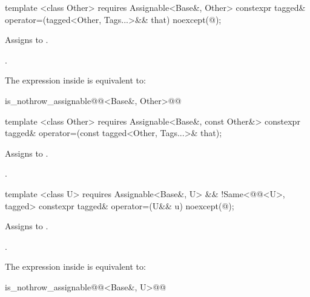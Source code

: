 {
\begin{itemdecl}
template <class Other>
  requires Assignable<Base&, Other>
constexpr tagged& operator=(tagged<Other, Tags...>&& that) noexcept(@\seebelow@);
\end{itemdecl}

\begin{itemdescr}
\pnum
\effects Assigns  to .

\pnum
\returns {}.

\pnum
\remarks The expression inside  is equivalent to:

\begin{codeblock}
is_nothrow_assignable@@<Base&, Other>@@
\end{codeblock}
\end{itemdescr}

\begin{itemdecl}
template <class Other>
  requires Assignable<Base&, const Other&>
constexpr tagged& operator=(const tagged<Other, Tags...>& that);
\end{itemdecl}

\begin{itemdescr}
\pnum
\effects Assigns  to .

\pnum
\returns {}.
\end{itemdescr}

\begin{itemdecl}
template <class U>
  requires Assignable<Base&, U> && !Same<@@<U>, tagged>
constexpr tagged& operator=(U&& u) noexcept(@\seebelow@);
\end{itemdecl}

\begin{itemdescr}
\pnum
\effects Assigns  to .

\pnum
\returns {}.

\pnum
\remarks The expression inside  is equivalent to:

\begin{codeblock}
is_nothrow_assignable@@<Base&, U>@@
\end{codeblock}
\end{itemdescr}

}
